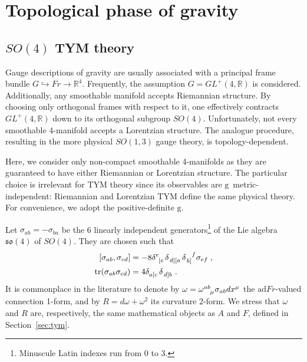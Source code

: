 \documentclass[../main.tex]{subfiles}
\begin{document}
\section{Topological phase of gravity}%
\label{sec:top_grav}

\subsection{\texorpdfstring{$SO(4)$}{SO(4)} TYM theory}%
\label{ssec:so4tym;sec:top_grav}

Gauge descriptions of gravity are usually associated with a principal frame bundle $G \hookrightarrow Fr \rightarrow \mathbb{R}^4 $. Frequently, the assumption $G = GL^{+}\left( 4, \mathbb{R} \right)$ is considered. Additionally, any smoothable manifold accepts Riemannian structure. By choosing only orthogonal frames with respect to it, one effectively contracts $GL^{+} \left( 4,\mathbb{R} \right)$ down to its orthogonal subgroup $SO \left( 4 \right)$. Unfortunately, not every smoothable 4-manifold accepts a Lorentzian structure. The analogue procedure, resulting in the more physical $SO \left( 1,3 \right)$ gauge theory, is topology-dependent.

Here, we consider only non-compact smoothable 4-manifolds as they are guaranteed to have either Riemannian or Lorentzian structure. The particular choice is irrelevant for TYM theory since its observables are $ \mathrm{g} $~metric-independent: Riemannian and Lorentzian TYM define the same physical theory. For convenience, we adopt the positive-definite $ \mathrm{g} $.

Let $\sigma_{ab}=-\sigma_{ba}$ be the 6 linearly independent generators\footnote{Minuscule Latin indexes run from 0 to 3.} of the Lie algebra $\mathfrak{so}\left( 4 \right)$ of $SO(4)$. They are chosen such that
\begin{subequations}%
  \label{eq:so4algebra}
  \begin{align}
    \left[ \sigma_{ab}, \sigma_{cd} \right] & =-8\tensor{\delta}{^{e}_{\left[ c \right.}}\tensor{\delta}{_{\left. d \right] \left[ a \right.}} \tensor{\delta}{_{\left. b \right]}^f} \sigma_{ef} \;, \\ %
    \tr (\sigma_{ab}\sigma_{cd})            & = 4 \tensor{\delta}{_{ a \left[ c \right. }} \tensor{\delta}{_{ \left. d \right] b }} \;.                                                               %
  \end{align}
\end{subequations}
It is commonplace in the literature to denote by $\omega=\tensor{\omega}{^{ab}_\mu} \sigma_{ab}dx^\mu$ the $\mathrm{ad} Fr $-valued connection 1-form, and by $R=d \omega + \omega^2$ its curvature 2-form. We stress that $ \omega $ and $ R $ are, respectively, the same mathematical objects as $A$ and $F$, defined in Section~\ref{sec:tym}.
\end{document}
